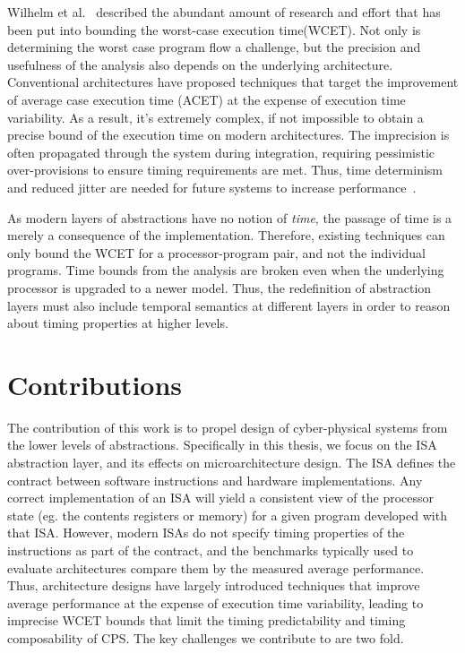 Wilhelm et al.~\cite{wilhelm-survey-paper} described the abundant amount of research and effort that has been put into bounding the worst-case execution time(WCET).   
Not only is determining the worst case program flow a challenge, but the precision and usefulness of the analysis also depends on the underlying architecture\cite{Heckmann2003processor}. 
Conventional architectures have proposed techniques that target the improvement of average case execution time (ACET) at the expense of execution time variability.    
As a result, it's extremely complex, if not impossible to obtain a precise bound of the execution time on modern architectures.
The imprecision is often propagated through the system during integration, requiring pessimistic over-provisions to ensure timing requirements are met.     
Thus, time determinism and reduced jitter are needed for future systems to increase performance~\cite{Sangiovanni-Vincentelli2007automotive}.    

As modern layers of abstractions have no notion of \emph{time}, the passage of time is a merely a consequence of the implementation.  
Therefore, existing techniques can only bound the WCET for a processor-program pair, and not the individual programs.
Time bounds from the analysis are broken even when the underlying processor is upgraded to a newer model.
Thus, the redefinition of abstraction layers must also include temporal semantics at different layers in order to reason about timing properties at higher levels.  

\section{Contributions}
The contribution of this work is to propel design of cyber-physical systems from the lower levels of abstractions. 
Specifically in this thesis, we focus on the ISA abstraction layer, and its effects on microarchitecture design. 
The ISA defines the contract between software instructions and hardware implementations.
Any correct implementation of an ISA will yield a consistent view of the processor state (eg. the contents registers or memory) for a given program developed with that ISA.     
However, modern ISAs do not specify timing properties of the instructions as part of the contract, and the benchmarks typically used to evaluate architectures compare them by the measured average performance.   
Thus, architecture designs have largely introduced techniques that improve average performance at the expense of execution time variability, leading to imprecise WCET bounds that limit the timing predictability and timing composability of CPS.
The key challenges we contribute to are two fold.

